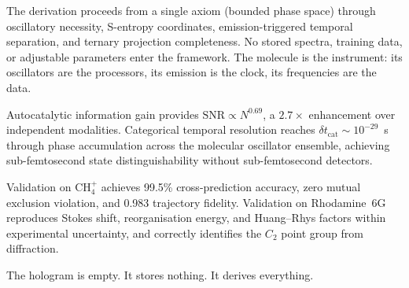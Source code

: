 \documentclass[11pt,twocolumn,a4paper]{article}
\theoremstyle{definition}
\theoremstyle{remark}
\begin{document}
The derivation proceeds from a single axiom (bounded phase space) through oscillatory necessity, S-entropy coordinates, emission-triggered temporal separation, and ternary projection completeness. No stored spectra, training data, or adjustable parameters enter the framework. The molecule is the instrument: its oscillators are the processors, its emission is the clock, its frequencies are the data.

Autocatalytic information gain provides $\mathrm{SNR} \propto N^{0.69}$, a $2.7\times$ enhancement over independent modalities. Categorical temporal resolution reaches $\delta t_{\mathrm{cat}} \sim 10^{-29}$~s through phase accumulation across the molecular oscillator ensemble, achieving sub-femtosecond state distinguishability without sub-femtosecond detectors.

Validation on CH$_4^+$ achieves 99.5\% cross-prediction accuracy, zero mutual exclusion violation, and 0.983 trajectory fidelity. Validation on Rhodamine~6G reproduces Stokes shift, reorganisation energy, and Huang--Rhys factors within experimental uncertainty, and correctly identifies the $C_2$ point group from diffraction.

The hologram is empty. It stores nothing. It derives everything.

\bigskip


\end{document}
